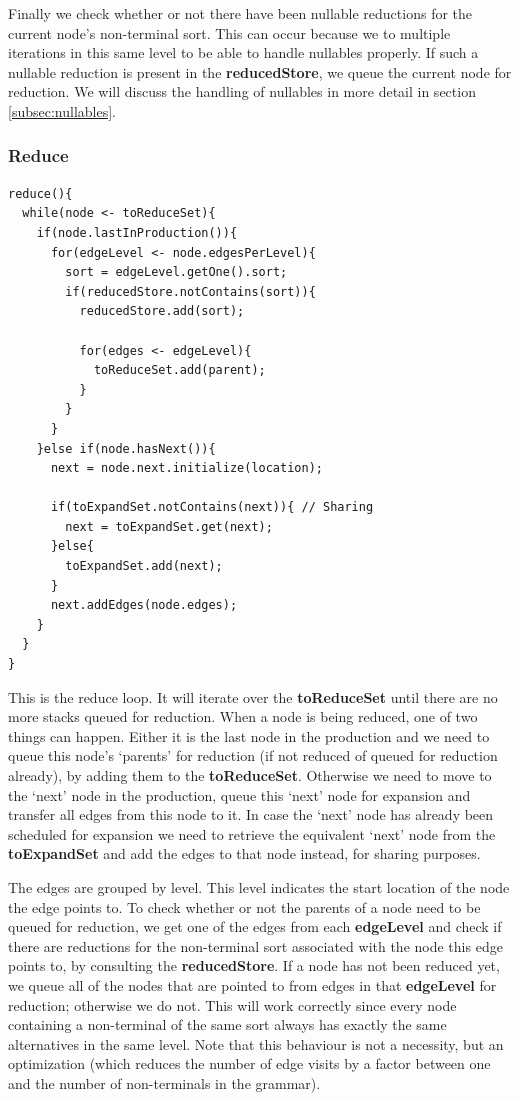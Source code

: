 \documentclass[a4paper,10pt]{article}
\begin{document}
Finally we check whether or not there have been nullable reductions for the current node's non-terminal sort. This can occur because we to multiple iterations in this same level to be able to handle nullables properly. If such a nullable reduction is present in the {\bf reducedStore}, we queue the current node for reduction. We will discuss the handling of nullables in more detail in section \ref{subsec:nullables}.

\pagebreak
\subsubsection{Reduce}
{\small
\begin{verbatim}
reduce(){
  while(node <- toReduceSet){
    if(node.lastInProduction()){
      for(edgeLevel <- node.edgesPerLevel){
        sort = edgeLevel.getOne().sort;
        if(reducedStore.notContains(sort)){
          reducedStore.add(sort);
          
          for(edges <- edgeLevel){
            toReduceSet.add(parent);
          }
        }
      }
    }else if(node.hasNext()){
      next = node.next.initialize(location);
      
      if(toExpandSet.notContains(next)){ // Sharing
        next = toExpandSet.get(next);
      }else{
        toExpandSet.add(next);
      }
      next.addEdges(node.edges);
    }
  }
}
\end{verbatim}
}

This is the reduce loop. It will iterate over the {\bf toReduceSet} until there are no more stacks queued for reduction. When a node is being reduced, one of two things can happen. Either it is the last node in the production and we need to queue this node's `parents' for reduction (if not reduced of queued for reduction already), by adding them to the {\bf toReduceSet}. Otherwise we need to move to the `next' node in the production, queue this `next' node for expansion and transfer all edges from this node to it. In case the `next' node has already been scheduled for expansion we need to retrieve the equivalent `next' node from the {\bf toExpandSet} and add the edges to that node instead, for sharing purposes.

The edges are grouped by level. This level indicates the start location of the node the edge points to. To check whether or not the parents of a node need to be queued for reduction, we get one of the edges from each {\bf edgeLevel} and check if there are reductions for the non-terminal sort associated with the node this edge points to, by consulting the {\bf reducedStore}. If a node has not been reduced yet, we queue all of the nodes that are pointed to from edges in that {\bf edgeLevel} for reduction; otherwise we do not. This will work correctly since every node containing a non-terminal of the same sort always has exactly the same alternatives in the same level. Note that this behaviour is not a necessity, but an optimization (which reduces the number of edge visits by a factor between one and the number of non-terminals in the grammar).
\end{document}
